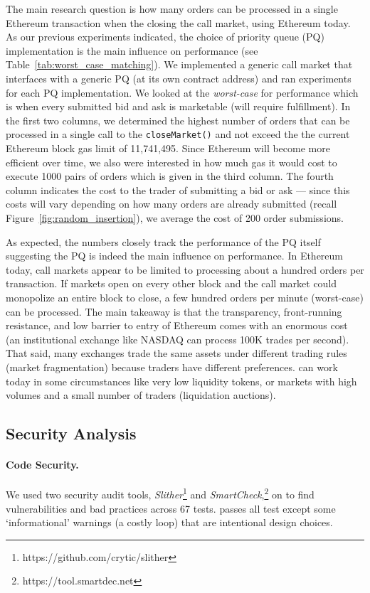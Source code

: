  
 
The main research question is how many orders can be processed in a single Ethereum transaction when the closing the call market, using Ethereum today. As our previous experiments indicated, the choice of priority queue (PQ) implementation is the main influence on performance (see Table~\ref{tab:worst_case_matching}). We implemented a generic call market that interfaces with a generic PQ (at its own contract address) and ran experiments for each PQ implementation. We looked at the \textit{worst-case} for performance which is when every submitted bid and ask is marketable (\ie will require fulfillment). In the first two columns, we determined the highest number of orders that can be processed in a single call to the \texttt{closeMarket()} and not exceed the the current Ethereum block gas limit of 11,741,495. Since Ethereum will become more efficient over time, we also were interested in how much gas it would cost to execute 1000 pairs of orders which is given in the third column. The fourth column indicates the cost to the trader of submitting a bid or ask --- since this costs will vary depending on how many orders are already submitted (recall Figure~\ref{fig:random_insertion}), we average the cost of 200 order submissions. 

As expected, the numbers closely track the performance of the PQ itself suggesting the PQ is indeed the main influence on performance. In Ethereum today, call markets appear to be limited to processing about a hundred orders per transaction. If markets open on every other block and the call market could monopolize an entire block to close, a few hundred orders per minute (worst-case) can be processed. The main takeaway is that the transparency, front-running resistance, and low barrier to entry of Ethereum comes with an enormous cost (\ie an institutional exchange like NASDAQ can process 100K trades per second). That said, many exchanges trade the same assets under different trading rules (\ie market fragmentation) because traders have different preferences. \cm can work today in some circumstances like very low liquidity tokens, or markets with high volumes and a small number of traders (\eg liquidation auctions). 

\subsection{Security Analysis} \label{sec:front}

\paragraph{Code Security.} We used two security audit tools, \textit{Slither}\footnote{https://github.com/crytic/slither} and \textit{SmartCheck},\footnote{https://tool.smartdec.net} on \cm to find vulnerabilities and bad practices across 67 tests. \cm passes all test except some `informational' warnings (\eg a costly loop) that are intentional design choices.

